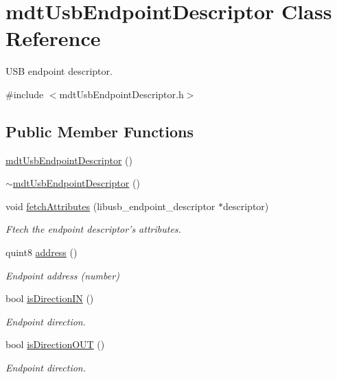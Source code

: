 \hypertarget{classmdt_usb_endpoint_descriptor}{\section{mdt\-Usb\-Endpoint\-Descriptor Class Reference}
\label{classmdt_usb_endpoint_descriptor}
}


U\-S\-B endpoint descriptor.  




{\ttfamily \#include $<$mdt\-Usb\-Endpoint\-Descriptor.\-h$>$}

\subsection*{Public Member Functions}
\begin{DoxyCompactItemize}
\item 
\hyperlink{classmdt_usb_endpoint_descriptor_adf827037bb0a066e8eeabf9d96145e7f}{mdt\-Usb\-Endpoint\-Descriptor} ()
\item 
\hyperlink{classmdt_usb_endpoint_descriptor_a44cf8f039efd58015fca837f8bd8e59f}{$\sim$mdt\-Usb\-Endpoint\-Descriptor} ()
\item 
void \hyperlink{classmdt_usb_endpoint_descriptor_af001cef68ba1e177a63b1f9ba02ddc6c}{fetch\-Attributes} (libusb\-\_\-endpoint\-\_\-descriptor $\ast$descriptor)
\begin{DoxyCompactList}\small\item\em Ftech the endpoint descriptor's attributes. \end{DoxyCompactList}\item 
quint8 \hyperlink{classmdt_usb_endpoint_descriptor_a478bc4bdec482184c0fc9af3218afad9}{address} ()
\begin{DoxyCompactList}\small\item\em Endpoint address (number) \end{DoxyCompactList}\item 
bool \hyperlink{classmdt_usb_endpoint_descriptor_a8f6bc6b31b436f21c3ad34f909f35ccf}{is\-Direction\-I\-N} ()
\begin{DoxyCompactList}\small\item\em Endpoint direction. \end{DoxyCompactList}\item 
bool \hyperlink{classmdt_usb_endpoint_descriptor_ae45b2407d6f973c25ff0058eb941857a}{is\-Direction\-O\-U\-T} ()
\begin{DoxyCompactList}\small\item\em Endpoint direction. \end{DoxyCompactList}\item 

\end{DoxyCompactItemize}
